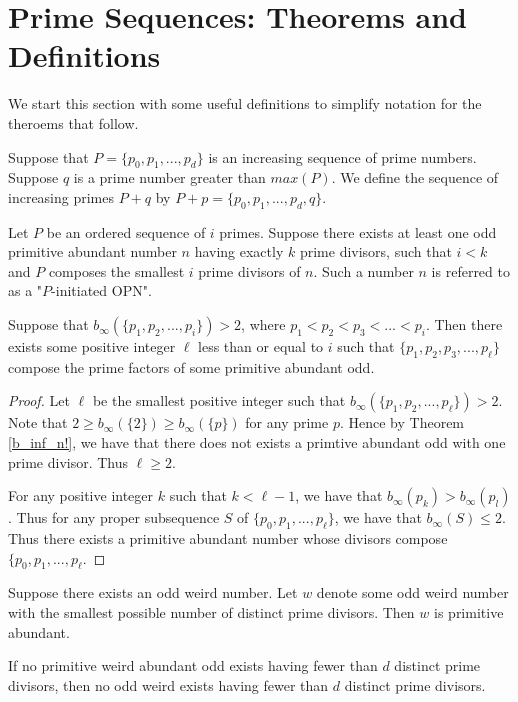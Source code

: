 \documentclass[../paper.tex]{subfiles}
\begin{document}
\section{Prime Sequences: Theorems and Definitions}

We start this section with some useful definitions to simplify
notation for the theroems that follow.

Suppose that $P = \{p_0, p_1, ..., p_d\}$ is an increasing 
sequence of prime numbers. Suppose $q$ is a prime number greater
than $max(P)$. We define the sequence of increasing primes $P + q$
by $P + p = \{p_0, p_1, ..., p_d, q\}$.

Let $P$ be an
ordered sequence of $i$ primes. Suppose there exists at least one
odd primitive abundant number $n$ having exactly $k$ prime divisors, 
such that $i < k$ and $P$ composes the smallest $i$ prime divisors of $n$.
Such a number $n$ is referred to as a "$P$-initiated OPN".

\begin{theorem} \label{Primechops}
Suppose that $b_{\infty}(\{p_1,p_2, ..., p_i\}) > 2$,
where $p_1 < p_2 < p_3 < ... < p_i$. Then there exists some
positive integer $\ell$ less than or equal to $i$ such that 
$\{p_1, p_2, p_3, ..., p_\ell\}$ compose the prime factors of
some primitive abundant odd.
\end{theorem}

\begin{proof}
Let $\ell$ be the smallest positive integer such that 
$b_{\infty}(\{p_1, p_2, ..., p_\ell\}) > 2$. Note that
$2 \geq b_{\infty}(\{2\}) \geq b_{\infty}(\{p\})$ for any prime $p$.
Hence by Theorem {\ref{b_inf_n!}}, we have that there does not exists a
primtive abundant odd with one prime divisor. Thus $\ell \geq 2$.

For any positive integer $k$ such that $k < \ell - 1$, we have
that $b_{\infty}(p_k) > b_{\infty}(p_l)$. Thus for any proper 
subsequence $S$ of $\{p_0, p_1, ..., p_{\ell}\}$, we have that 
$b_{\infty}(S) \leq 2$. Thus there exists a primitive abundant
number whose divisors compose $\{p_0, p_1, ..., p_{\ell}$.
\end{proof}

\begin{theorem} Suppose there exists an odd weird number. Let $w$
denote some odd weird number with the smallest possible number of
distinct prime divisors. Then $w$ is primitive abundant.
\end{theorem}

\begin{coro} If no primitive weird abundant odd exists
having fewer than $d$ distinct prime divisors, then no odd weird
exists having fewer than $d$ distinct prime divisors.
\end{coro}
\end{document}
